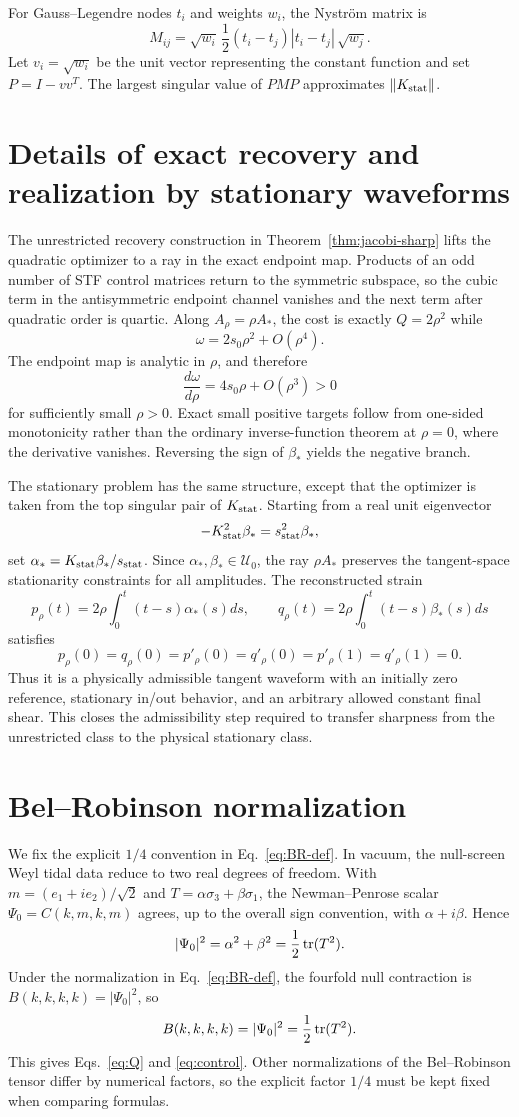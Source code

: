 For Gauss--Legendre nodes $t_i$ and weights $w_i$, the Nystr\"om matrix is
\[
M_{ij}=\sqrt{w_i}\,\frac12(t_i-t_j)|t_i-t_j|\,\sqrt{w_j}.
\]
Let $v_i=\sqrt{w_i}$ be the unit vector representing the constant function and set $P=I-vv^T$. The largest singular value of $PMP$ approximates $\|K_{\rm stat}\|$.

\section{Details of exact recovery and realization by stationary waveforms}
The unrestricted recovery construction in Theorem~\ref{thm:jacobi-sharp} lifts the quadratic optimizer to a ray in the exact endpoint map. Products of an odd number of STF control matrices return to the symmetric subspace, so the cubic term in the antisymmetric endpoint channel vanishes and the next term after quadratic order is quartic. Along $A_\rho=\rho A_*$, the cost is exactly $Q=2\rho^2$ while
\[
\omega=2s_0\rho^2+O(\rho^4).
\]
The endpoint map is analytic in $\rho$, and therefore
\[
\frac{d\omega}{d\rho}=4s_0\rho+O(\rho^3)>0
\]
for sufficiently small $\rho>0$. Exact small positive targets follow from one-sided monotonicity rather than the ordinary inverse-function theorem at $\rho=0$, where the derivative vanishes. Reversing the sign of $\beta_*$ yields the negative branch.

The stationary problem has the same structure, except that the optimizer is taken from the top singular pair of $K_{\rm stat}$. Starting from a real unit eigenvector
\[
-K_{\rm stat}^2\beta_*=s_{\rm stat}^2\beta_*,
\]
set $\alpha_*=K_{\rm stat}\beta_*/s_{\rm stat}$. Since $\alpha_*,\beta_*\in\mathcal U_0$, the ray $\rho A_*$ preserves the tangent-space stationarity constraints for all amplitudes. The reconstructed strain
\[
p_\rho(t)=2\rho\int_0^t(t-s)\alpha_*(s)ds,\qquad
q_\rho(t)=2\rho\int_0^t(t-s)\beta_*(s)ds
\]
satisfies
\[
p_\rho(0)=q_\rho(0)=p'_\rho(0)=q'_\rho(0)=p'_\rho(1)=q'_\rho(1)=0.
\]
Thus it is a physically admissible tangent waveform with an initially zero reference, stationary in/out behavior, and an arbitrary allowed constant final shear. This closes the admissibility step required to transfer sharpness from the unrestricted class to the physical stationary class.

\section{Bel--Robinson normalization}
We fix the explicit $1/4$ convention in Eq.~\eqref{eq:BR-def}. In vacuum, the null-screen Weyl tidal data reduce to two real degrees of freedom. With $m=(e_1+ie_2)/\sqrt2$ and $T=\alpha\sigma_3+\beta\sigma_1$, the Newman--Penrose scalar $\Psi_0=C(k,m,k,m)$ agrees, up to the overall sign convention, with $\alpha+i\beta$. Hence
\[
|\Psi_0|^2=\alpha^2+\beta^2=\frac12\operatorname{tr}(T^2).
\]
Under the normalization in Eq.~\eqref{eq:BR-def}, the fourfold null contraction is $B(k,k,k,k)=|\Psi_0|^2$, so
\[
B(k,k,k,k)=|\Psi_0|^2=\frac12\operatorname{tr}(T^2).
\]
This gives Eqs.~\eqref{eq:Q} and \eqref{eq:control}. Other normalizations of the Bel--Robinson tensor differ by numerical factors, so the explicit factor $1/4$ must be kept fixed when comparing formulas.

